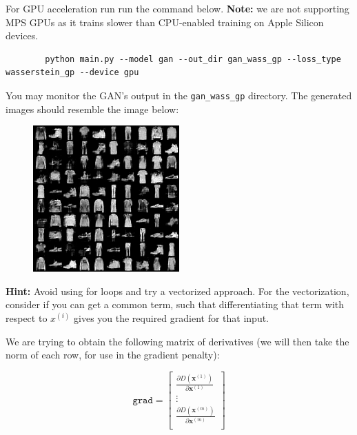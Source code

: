 \begin{enumerate}[label=(\alph*)]
    For GPU acceleration run run the command below. \textbf{Note:} we are not supporting MPS GPUs as it trains slower than CPU-enabled training on Apple Silicon devices.
    \begin{verbatim}
        python main.py --model gan --out_dir gan_wass_gp --loss_type wasserstein_gp --device gpu
    \end{verbatim} 
    
    You may monitor the GAN's output in the \texttt{gan\_wass\_gp} directory. The generated images should resemble the image below:

    \begin{figure}[h]
        \centering
        \includegraphics[width=0.5\textwidth]{./figures/gan_wass_gp_0900}
    \end{figure}

    \textbf{Hint: }Avoid using for loops and try a vectorized approach. For the vectorization, consider if you can get a 
    common term, such that differentiating that term with respect to $x^{(i)}$ gives you the required gradient for that input.

    We are trying to obtain the following matrix of derivatives 
    (we will then take the norm of each row, for use in the gradient penalty): 

    \begin{center}
       
        \[
            \texttt{grad} =
            \begin{bmatrix}
                \frac{\partial D(\bm{x}^{(1)})}{\partial \bm{x}^{(1)}} \\
                \vdots \\
                \frac{\partial D(\bm{x}^{(m)})}{\partial \bm{x}^{(m)}} \\
            \end{bmatrix}
        \]
    \end{center}


\end{enumerate}
